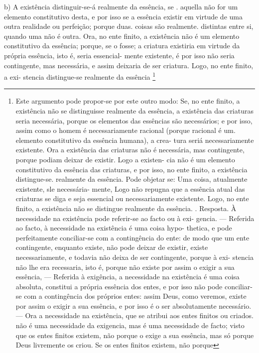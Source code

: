 \documentclass[12pt,a4paper]{article}
\begin{document}
{{{{{{{{{{{{{{     \medskip\noindent b) A existência distinguir-se-á realmente da essência, se
 . aquella não for um elemento constitutivo desta, e por isso se a
 essência existir em virtude de uma outra realidade
 ou perfeição;
 porque duas. coisas são realmente. distintas entre si, quando
 uma não é outra. Ora, no ente finito, a existência não é um
 elemento constitutivo da essência; porque, se o fosse; a criatura
 existiria em virtude da própria essência, isto é, seria essencial-
 mente existente, é por isso não seria contingente, mas necessária,
 e assim deixaria de ser criatura. Logo, no ente finito, a exi-
 stencia distingue-se realmente da essência \footnote{Este argumento pode propor-se por este outro modo:
 Se, no ente finito, a existência não se distinguisse realmente da essência,
 a existência das criaturas seria necessária, porque os elementos das essências
 são necessários; e por isso, assim como o homem é necessariamente racional
 (porque racional é um. elemento constitutivo da essência humana), a crea-
 tura seriá necessariamente existente. Ora a existência das criaturas não é
 necessária, mas contingente, porque podiam deixar de existir. Logo a existen-
 cia não é um elemento constitutivo da essência das criaturas, e por isso,
 no ente finito, a existência distingue-se. realmente da essência.
 Pode objetar se: Uma coisa, atualmente existente, sle necessária-
 mente, Logo não repugna que a essência atual das criaturas se diga e seja
 essencial ou necessariamente existente. Logo, no ente finito, a existência não
 se distingue realmente da essência. .
 Resposta. À necessidade na existência pode referir-se ao facto ou à exi-
 gencia. — Referida ao facto, à necessidade na existência é uma coisa hypo-
 thetica, e pode perfeitamente conciliar-se com a contingência do ente: de
 modo que um ente contingente, enquanto existe, não pode deixar de existir,
 existe necessariamente, e todavia não deixa de ser contingente, porque à exi-
 stencia não lhe era recessaria, isto é, porque não existe por assim o exigir a
 sua essência, — Referida à exigência, a necessidade na existência é uma coisa
 absoluta, constitui a própria essência dos entes, e por isso não pode conciliar-se
 com a contingência dos próprios entes: assim Deus, como veremos, existe por
 assim o exigir a sua essência, e por isso é o ser absolutamente necessário. —
 Ora a necessidade na existência, que se atribui aos entes finitos ou criados.
 não é uma necessidade da exigencia, mas é uma necessidade de facto; visto
 que os entes finitos existem, não porque o exige a sua essência, mas
 só porque Deus livremente os criou. Se os entes finitos existem, não porque
}}}}}}}}}}}}}}}
\end{document}
